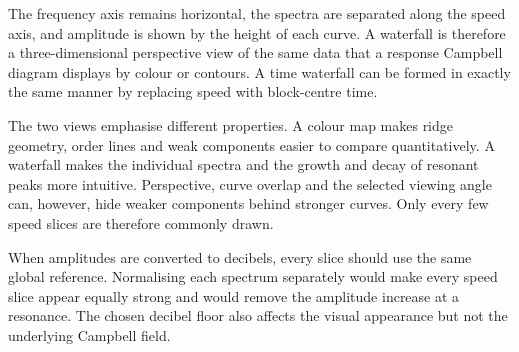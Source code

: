 The frequency axis remains horizontal, the spectra are separated along the
speed axis, and amplitude is shown by the height of each curve. A waterfall is
therefore a three-dimensional perspective view of the same data that a response
Campbell diagram displays by colour or contours. A time waterfall can be formed
in exactly the same manner by replacing speed with block-centre time.

The two views emphasise different properties. A colour map makes ridge geometry,
order lines and weak components easier to compare quantitatively. A waterfall
makes the individual spectra and the growth and decay of resonant peaks more
intuitive. Perspective, curve overlap and the selected viewing angle can,
however, hide weaker components behind stronger curves. Only every few speed
slices are therefore commonly drawn.

When amplitudes are converted to decibels, every slice should use the same global
reference. Normalising each spectrum separately would make every speed slice
appear equally strong and would remove the amplitude increase at a resonance.
The chosen decibel floor also affects the visual appearance but not the
underlying Campbell field.

